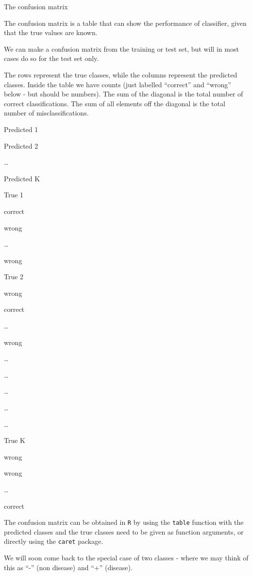 \documentclass[10pt,ignorenonframetext,]{beamer}
\begin{document}
\begin{frame}

\begin{block}{The confusion matrix}

The confusion matrix is a table that can show the performance of
classifier, given that the true values are known.

We can make a confusion matrix from the training or test set, but will
in most cases do so for the test set only.

The rows represent the true classes, while the columns represent the
predicted classes. Inside the table we have counts (just labelled
``correct'' and ``wrong'' below - but should be numbers). The sum of the
diagonal is the total number of correct classifications. The sum of all
elements off the diagonal is the total number of misclassifications.

Predicted 1

Predicted 2

\ldots{}

Predicted K

True 1

correct

wrong

\ldots{}

wrong

True 2

wrong

correct

\ldots{}

wrong

\ldots{}

\ldots{}

\ldots{}

\ldots{}

\ldots{}

True K

wrong

wrong

\ldots{}

correct

\end{block}

\end{frame}

\begin{frame}[fragile]

The confusion matrix can be obtained in \texttt{R} by using the
\texttt{table} function with the predicted classes and the true classes
need to be given as function arguments, or directly using the
\texttt{caret} package.

We will soon come back to the special case of two classes - where we may
think of this as ``-'' (non disease) and ``+'' (disease).

\end{frame}
\end{document}

